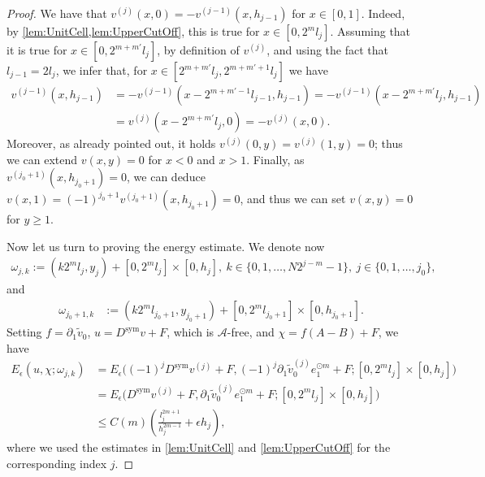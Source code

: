 \documentclass[a4paper, 10pt, twoside, notitlepage]{amsart}
\theoremstyle{plain}
\newcommand{\p}{\partial}
\newcommand{\A}{\mathcal{A}}
\newcommand{\Ds}{D^{\text{sym}}}
\begin{document}
\begin{proof}
We have that $v^{(j)}(x,0) = - v^{(j-1)}(x,h_{j-1})$ for $x\in[0,1].$
Indeed, by \cref{lem:UnitCell,lem:UpperCutOff}, this is true for $x \in [0,2^ml_j]$.
Assuming that it is true for $x\in[0,2^{m+m'}l_j]$, by definition of $v^{(j)}$, and using the fact that $l_{j-1}=2l_j$, we infer that, for $x\in[2^{m+m'}l_j,2^{m+m'+1}l_j]$ we have 
\begin{align*}
v^{(j-1)}(x,h_{j-1}) 
&= - v^{(j-1)}(x-2^{m+m'-1}l_{j-1},h_{j-1}) = - v^{(j-1)}(x-2^{m+m'}l_j,h_{j-1})\\
& = v^{(j)}(x-2^{m+m'}l_j,0) = -v^{(j)}(x,0).
\end{align*}
Moreover, as already pointed out, it holds $v^{(j)}(0,y) = v^{(j)}(1,y) = 0$; 
                        thus we can extend $v(x,y) = 0$ for $x < 0$ and $x>1$. Finally, as $v^{(j_0+1)}(x,h_{j_0+1}) = 0$, we can deduce $v(x,1) = (-1)^{j_0+1} v^{(j_0+1)}(x,h_{j_0+1}) = 0$, and thus we can set $v(x,y) = 0$ for $y \geq 1$.

Now let us turn to proving the energy estimate. We denote now
\begin{align*}
\omega_{j,k} := (k2^ml_j,y_j) + [0,2^ml_j] \times [0,h_j], \  k \in \{ 0,1,\dots,N2^{j-m}-1\}, \ j \in \{ 0,1,\dots,j_0\},
\end{align*}
and
\begin{align*}
  \omega_{j_0+1,k} & := (k2^ml_{j_0+1},y_{j_0+1}) + [0,2^ml_{j_0+1}] \times [0,h_{j_0+1}].
\end{align*}
                        Setting $f = \p_1 \tilde{v}_0$, $u = \Ds v + F$, which is $\A$-free, and $\chi = f (A-B) + F$, we have
				\begin{align*}
                                  E_\epsilon (u,\chi;\omega_{j,k}) &= E_\epsilon\Big((-1)^{j} \Ds v^{(j)}+F,(-1)^j\p_1 \tilde{v}_0^{(j)} e_1^{\odot m} + F;[0,2^ml_j] \times [0,h_j]\Big) \\
			      &= E_\epsilon\Big(\Ds v^{(j)}+F,\p_1 \tilde{v}_0^{(j)} e_1^{\odot m} + F;[0,2^ml_j] \times [0,h_j]\Big) \\
                                  & \leq C(m) (\frac{l_j^{2m+1}}{h_j^{2m-1}} + \epsilon h_j),
				\end{align*}
				where we used the estimates in \cref{lem:UnitCell} and \cref{lem:UpperCutOff} for the corresponding index $j$.
			

\end{proof}
\end{document}
